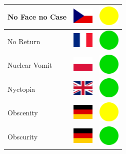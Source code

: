 \documentclass[12pt, a4paper, twoside]{report}
\begin{document}
\begin{center}
\begin{longtable}{|p{5cm}|p{2cm}|p{2cm}|}
 No Face no Case                                            & \includegraphics[width=1cm]{4x3/cz} &   \includegraphics[width=1cm]{likes/m} \\ \hline
 No Return                                                  & \includegraphics[width=1cm]{4x3/fr} &   \includegraphics[width=1cm]{likes/y} \\ \hline
 Nuclear Vomit                                              & \includegraphics[width=1cm]{4x3/pl} &   \includegraphics[width=1cm]{likes/y} \\ \hline
 Nyctopia                                                   & \includegraphics[width=1cm]{4x3/gb} &   \includegraphics[width=1cm]{likes/y} \\ \hline
 Obscenity                                                  & \includegraphics[width=1cm]{4x3/de} &   \includegraphics[width=1cm]{likes/m} \\ \hline
 Obscurity                                                  & \includegraphics[width=1cm]{4x3/de} &   \includegraphics[width=1cm]{likes/y} \\ \hline

\end{longtable}
\end{center}
\end{document}
